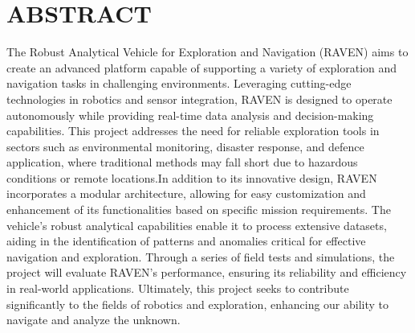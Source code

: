 \newpage
\thispagestyle{empty}
\setcounter{page}{1}

\chapter*{\vspace{-1.5in}ABSTRACT\vspace{-0.1in}}


\vspace*{0.5in}
\fontsize{12}{14} 

The Robust Analytical Vehicle for Exploration and Navigation (RAVEN) aims to create an advanced platform capable of supporting a variety of exploration and navigation tasks in challenging environments. Leveraging cutting-edge technologies in robotics and sensor integration, RAVEN is designed to operate autonomously while providing real-time data analysis and decision-making capabilities. This project addresses the need for reliable exploration tools in sectors such as environmental monitoring, disaster response, and defence application, where traditional methods may fall short due to hazardous conditions or remote locations.In addition to its innovative design, RAVEN incorporates a modular architecture, allowing for easy customization and enhancement of its functionalities based on specific mission
requirements. The vehicle's robust analytical capabilities enable it to process extensive datasets, aiding in the identification of patterns and anomalies critical for effective navigation and exploration. Through a series of field tests and simulations, the project will evaluate RAVEN's performance, ensuring its reliability and efficiency in real-world applications. Ultimately, this project seeks to contribute significantly to the fields of robotics and
exploration, enhancing our ability to navigate and analyze the unknown.